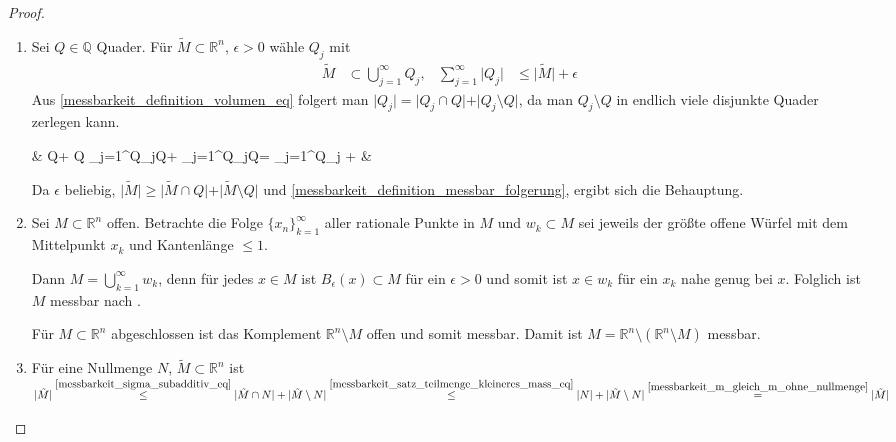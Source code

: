 \begin{proof}\hspace*{0pt}
	\begin{enumerate}[label={\alph*)},topsep=\dimexpr -\baselineskip / 2 \relax]
		\item Sei $Q\in\mathbb{Q}$ Quader. Für $\tilde{M}\subset\mathbb{R}^n$, $\epsilon > 0$ wähle $Q_j$ mit \begin{align*}
			\tilde{M} &\subset \bigcup_{j=1}^\infty Q_j,& \sum_{j=1}^\infty \vert Q_j\vert &\le \vert \tilde{M}\vert + \epsilon
		\end{align*}
		Aus \eqref{messbarkeit_definition_volumen_eq} folgert man $\vert Q_j\vert = \vert Q_j\cap Q\vert + \vert Q_j\setminus Q\vert$, da man $Q_j\setminus Q$ in endlich viele disjunkte Quader zerlegen kann.
		\begin{flalign*}
		\;\;\Rightarrow\;\; & \vert {}\cap Q\vert + \vert {}\setminus Q\vert \overset{\eqref{messbarkeit_sigma_subadditiv_eq}}{\le} \sum_{j=1}^\infty \vert Q_j\cap Q\vert + \sum_{j=1}^\infty \vert Q_j\setminus Q\vert = \sum_{j=1}^\infty \vert Q_j\vert\le \vert {} \vert + \epsilon &
		\end{flalign*}
		Da $\epsilon$ beliebig, $\vert \tilde{M} \vert \ge \vert \tilde{M} \cap Q\vert + \vert \tilde{M} \setminus Q\vert$ und \eqref{messbarkeit_definition_messbar_folgerung}, ergibt sich die Behauptung.
		
		\item Sei $M\subset\mathbb{R}^n$ offen. Betrachte die Folge $\{x_n\}_{k=1}^\infty$ aller rationale Punkte in $M$ und $w_k\subset M$ sei jeweils der größte offene Würfel mit dem Mittelpunkt $x_k$ und Kantenlänge $\le 1$.
		
		Dann $M = \bigcup_{k=1}^\infty w_k$, denn für jedes $x\in M$ ist $B_{\epsilon}(x)\subset M$ für ein $\epsilon > 0$ und somit ist $x\in w_k$ für ein $x_k$ nahe genug bei $x$. Folglich ist $M$ messbar nach .
		
		Für $M\subset\mathbb{R}^n$ abgeschlossen ist das Komplement $\mathbb{R}^n\setminus M$ offen und somit messbar. Damit ist $M=\mathbb{R}^n\setminus (\mathbb{R}^n\setminus M)$ messbar.
		
		\item Für eine Nullmenge $N$, $\tilde{M}\subset\mathbb{R}^n$ ist $\vert \tilde{M} \vert \overset{\eqref{messbarkeit_sigma_subadditiv_eq}}{\le} \vert \tilde{M}\cap N\vert + \vert \tilde{M} \setminus N\vert \overset{\eqref{messbarkeit_satz_teilmenge_kleineres_mass_eq}}{\le} \vert N \vert + \vert \tilde{M} \setminus N\vert \overset{\eqref{messbarkeit_m_gleich_m_ohne_nullmenge}}{=} \vert\tilde{M}\vert$
		

\end{enumerate}
\end{proof}
